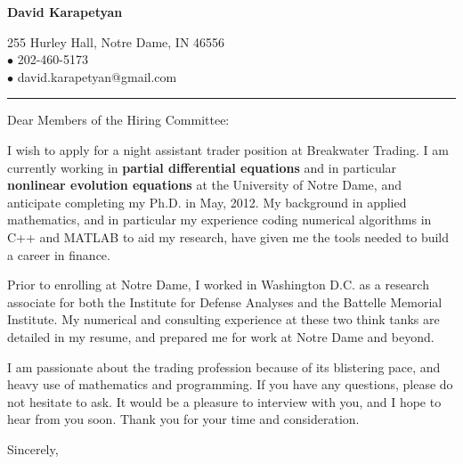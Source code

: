 \documentclass[12pt]{letter}
\date{\vspace{0.5cm}\flushleft}
\begin{document}
\begin{letter}{}
    \begin{center}
{\bf {\Large David Karapetyan}}
\end{center}

\begin{center}
{255 Hurley Hall, Notre Dame, IN 46556  \\ $\bullet$
202-460-5173 \\ $\bullet$ david.karapetyan@gmail.com
}
\end{center}
\hrule

\opening{Dear Members of the Hiring Committee:\\}
%
%
I wish to apply for a night assistant trader position at Breakwater Trading. I am
currently working in \textbf{partial differential equations} and in particular
\textbf{nonlinear evolution equations} at the University of Notre Dame, and 
anticipate completing my Ph.D. in May, 2012. My
background in applied mathematics, and in particular my experience coding
numerical algorithms in C++ and MATLAB to aid my research, have given me the
tools needed to build a career in finance.

Prior to enrolling at Notre Dame, I worked in Washington D.C. as a research
associate for both the Institute for Defense Analyses and the Battelle Memorial
Institute. My numerical and consulting experience at these two think tanks are
detailed in my resume, and prepared me for work at Notre Dame and beyond. 

I am passionate about the trading profession because of its blistering pace, and heavy use of mathematics and programming. 
If you have any questions, please do not hesitate to ask. It would be a
pleasure to interview with you, and I hope to hear from you soon. Thank you for
your time and consideration. 

\closing{Sincerely,}


\end{letter}
\end{document}
